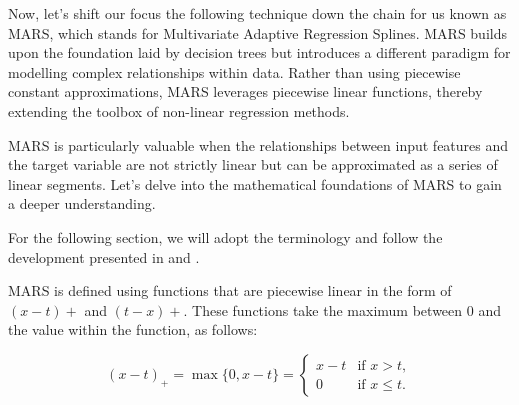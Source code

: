 Now, let's shift our focus the following technique down the chain for us known as MARS, which stands for Multivariate Adaptive Regression Splines. MARS builds upon the foundation laid by decision trees but introduces a different paradigm for modelling complex relationships within data. Rather than using piecewise constant approximations, MARS leverages piecewise linear functions, thereby extending the toolbox of non-linear regression methods.

MARS is particularly valuable when the relationships between input features and the target variable are not strictly linear but can be approximated as a series of linear segments. Let's delve into the mathematical foundations of MARS to gain a deeper understanding.

For the following section, we will adopt the terminology and follow the development presented in \cite{Friedman_1991} and \cite{friedman1991multivariate}.

MARS is defined using functions that are piecewise linear in the form of $(x - t)+$ and $(t - x)+$. These functions take the maximum between 0 and the value within the function, as follows:

$$
(x - t)_+ = \max\{ 0, x - t \}= \begin{cases} 
	x - t &\mbox{if } x > t, \\
	0 & \mbox{if } x \leq t. \end{cases}
$$


